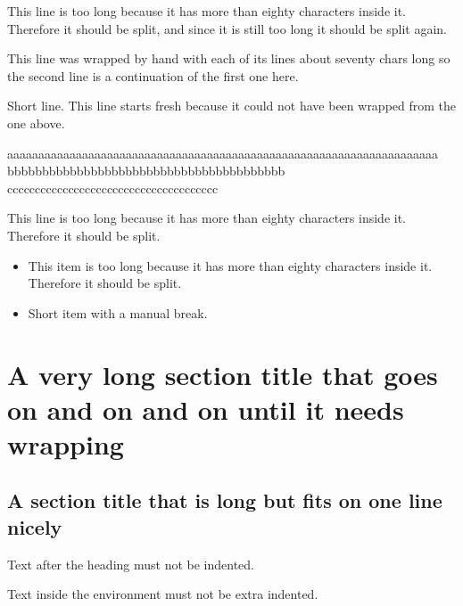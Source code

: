 \documentclass{article}
\begin{document}
This line is too long because it has more than eighty characters inside it. Therefore it should be split, and since it is still too long it should be split again.

This line was wrapped by hand with each of its lines about seventy chars
long so the second line is a continuation of the first one here.

Short line.
This line starts fresh because it could not have been wrapped from the one above.

aaaaaaaaaaaaaaaaaaaaaaaaaaaaaaaaaaaaaaaaaaaaaaaaaaaaaaaaaaaaaaaaaaaaa bbbbbbbbbbbbbbbbbbbbbbbbbbbbbbbbbbbbbbbb cccccccccccccccccccccccccccccccccccccc

\begin{theorem}
This line is too long because it has more than eighty characters inside it. Therefore it should be split.
\end{theorem}

\begin{itemize}
\item This item is too long because it has more than eighty characters inside it. Therefore it should be split.
\item Short item
with a manual break.
\end{itemize}

\section{A very long section title that goes on and on and on until it needs wrapping}

\subsection{A section title that is long but fits on one line nicely}
Text after the heading must not be indented.

\begin{theorem}
Text inside the environment must not be extra indented.
\end{theorem}

\end{document}
